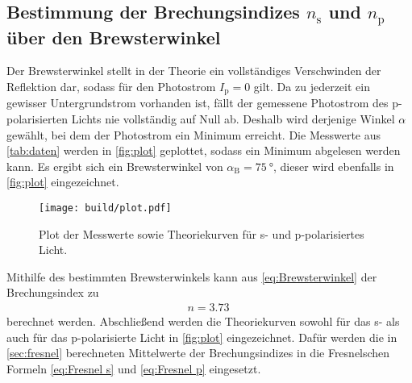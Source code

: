 \subsection{Bestimmung der Brechungsindizes $n_{\text{s}}$ und $n_{\text{p}}$ über den Brewsterwinkel}

Der Brewsterwinkel stellt in der Theorie ein vollständiges Verschwinden der Reflektion dar, sodass für den Photostrom $I_{\text{p}}=0$
gilt.
Da zu jederzeit ein gewisser Untergrundstrom vorhanden ist, fällt der gemessene Photostrom des p-polarisierten Lichts nie
vollständig auf Null ab. Deshalb wird derjenige Winkel $\alpha$ gewählt, bei dem der Photostrom ein Minimum erreicht.
Die Messwerte aus \autoref{tab:daten} werden in \autoref{fig:plot} geplottet, sodass ein Minimum abgelesen werden kann.
Es ergibt sich ein Brewsterwinkel von $\alpha_{\text{B}}=\qty{75}{\degree}$, dieser wird ebenfalls in \autoref{fig:plot} eingezeichnet.

\begin{figure}[H]
    \centering
    \texttt{[image: build/plot.pdf]}
    \caption{Plot der Messwerte sowie Theoriekurven für s- und p-polarisiertes Licht.}
    \label{fig:plot}
\end{figure}

Mithilfe des bestimmten Brewsterwinkels kann aus \eqref{eq:Brewsterwinkel} der Brechungsindex zu
\begin{gather*}
    n=\qty{3.73}{}
\end{gather*}
berechnet werden. Abschließend werden die Theoriekurven sowohl für das s- als auch für das p-polarisierte Licht
in \autoref{fig:plot} eingezeichnet. Dafür werden die in \ref{sec:fresnel} berechneten Mittelwerte der Brechungsindizes
in die Fresnelschen Formeln \eqref{eq:Fresnel s} und \eqref{eq:Fresnel p} eingesetzt.